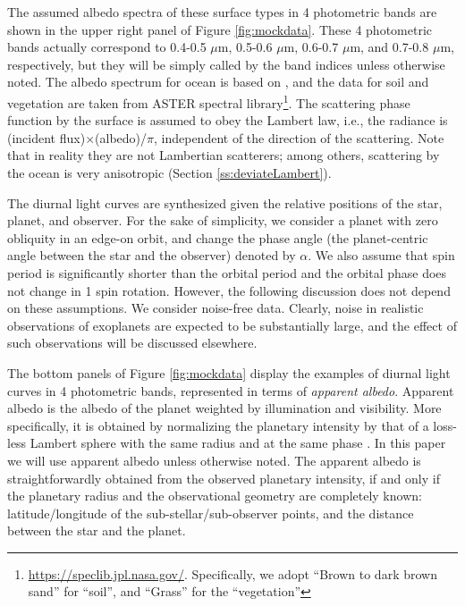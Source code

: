 \documentclass[iop,numberedappendix,apj,]{emulateapj}
\def\memoJLY#1{\color{green}[JLY: {\bf #1}]\color{black}}
\begin{document}
The assumed albedo spectra of these surface types in 4 photometric bands are shown in the upper right panel of Figure \ref{fig:mockdata}. 
These 4 photometric bands actually correspond to 0.4-0.5 $\mu $m, 0.5-0.6 $\mu $m, 0.6-0.7 $\mu $m, and 0.7-0.8 $\mu $m, respectively, but they will be simply called by the band indices unless otherwise noted. 
The albedo spectrum for ocean is based on \citet{Mclinden1997}, 
and the data for soil and vegetation are taken from ASTER spectral library\footnote{\url{https://speclib.jpl.nasa.gov/}. 
Specifically, we adopt  ``Brown to dark brown sand'' for ``soil'', and ``Grass'' for the ``vegetation''}. 
The scattering phase function by the surface is assumed to obey the Lambert law, i.e., the radiance is (incident flux)$\times $(albedo)/$\pi$, independent of the direction of the scattering. 
Note that in reality they are not Lambertian scatterers; among others,  scattering by the ocean is very anisotropic (Section \ref{ss:deviateLambert}).  


{\color{red} 
The diurnal light curves are synthesized given the relative positions of the star, planet, and observer. 
For the sake of simplicity, we consider a planet with zero obliquity in an edge-on orbit, and change the phase angle (the planet-centric angle between the star and the observer) denoted by $\alpha $. 
We also assume that spin period is significantly shorter than the orbital period and the orbital phase does not change in 1 spin rotation. 
However, the following discussion does not depend on these assumptions. 
We consider noise-free data. Clearly, noise in realistic observations of exoplanets are expected to be substantially large, and the effect of such observations will be discussed elsewhere.}
\color{black}

The bottom panels of Figure \ref{fig:mockdata} display the examples of diurnal light curves in 4 photometric bands, represented in terms of {\it apparent albedo}. 
Apparent albedo is the albedo of the planet weighted by illumination and visibility. 
More specifically, it is obtained by normalizing the planetary intensity by that of a loss-less Lambert sphere with the same radius and at the same phase \citep{Qiu2003, Seager2010}. 
In this paper we will use apparent albedo unless otherwise noted. 
The apparent albedo is straightforwardly obtained from the observed planetary intensity, if and only if the planetary radius and the observational geometry are completely known: latitude/longitude of the sub-stellar/sub-observer points, and the distance between the star and the planet. 
\end{document}
